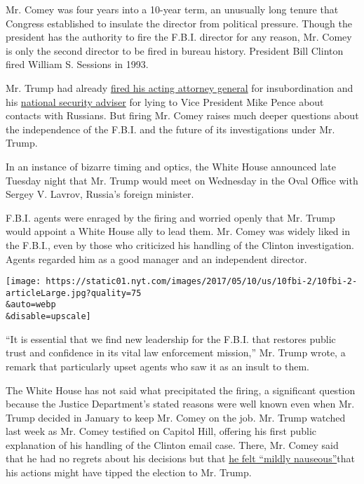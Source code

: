 Mr. Comey was four years into a 10-year term, an unusually long tenure
that Congress established to insulate the director from political
pressure. Though the president has the authority to fire the F.B.I.
director for any reason, Mr. Comey is only the second director to be
fired in bureau history. President Bill Clinton fired William S.
Sessions in 1993.

Mr. Trump had already
\href{https://www.nytimes.com/2017/01/30/us/politics/trump-immigration-ban-memo.html}{fired
his acting attorney general} for insubordination and his
\href{https://www.nytimes.com/2017/02/13/us/politics/donald-trump-national-security-adviser-michael-flynn.html}{national
security adviser} for lying to Vice President Mike Pence about contacts
with Russians. But firing Mr. Comey raises much deeper questions about
the independence of the F.B.I. and the future of its investigations
under Mr. Trump.

In an instance of bizarre timing and optics, the White House announced
late Tuesday night that Mr. Trump would meet on Wednesday in the Oval
Office with Sergey V. Lavrov, Russia's foreign minister.

F.B.I. agents were enraged by the firing and worried openly that Mr.
Trump would appoint a White House ally to lead them. Mr. Comey was
widely liked in the F.B.I., even by those who criticized his handling of
the Clinton investigation. Agents regarded him as a good manager and an
independent director.

\texttt{[image: https://static01.nyt.com/images/2017/05/10/us/10fbi-2/10fbi-2-articleLarge.jpg?quality=75\\\&auto=webp\\\&disable=upscale]}

``It is essential that we find new leadership for the F.B.I. that
restores public trust and confidence in its vital law enforcement
mission,'' Mr. Trump wrote, a remark that particularly upset agents who
saw it as an insult to them.

The White House has not said what precipitated the firing, a significant
question because the Justice Department's stated reasons were well known
even when Mr. Trump decided in January to keep Mr. Comey on the job. Mr.
Trump watched last week as Mr. Comey testified on Capitol Hill, offering
his first public explanation of his handling of the Clinton email case.
There, Mr. Comey said that he had no regrets about his decisions but
that
\href{https://www.nytimes.com/2017/05/03/us/politics/james-comey-fbi-senate-hearing.html}{he
felt ``mildly nauseous''}that his actions might have tipped the election
to Mr. Trump.

